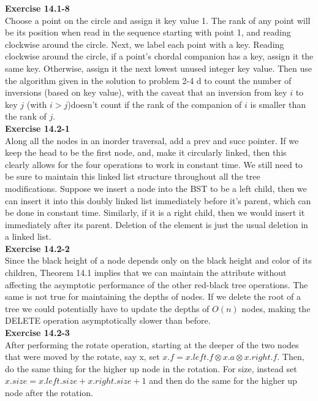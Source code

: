 \documentclass{article}
\begin{document}
\noindent\textbf{Exercise 14.1-8}\\

Choose a point on the circle and assign it key value 1. The rank of any point will be its position when read in the sequence starting with point 1, and reading clockwise around the circle.  Next, we label each point with a key.  Reading clockwise around the circle, if a point's chordal companion has a key, assign it the same key.  Otherwise, assign it the next lowest unused integer key value. Then use the algorithm given in the solution to problem 2-4 d to count the number of inversions (based on key value), with the caveat that an inversion from key $i$ to key $j$ (with $i > j$)doesn't count if the rank of the companion of $i$ is smaller than the rank of $j$.\\

\noindent\textbf{ Exercise 14.2-1} \\

Along all the nodes in an inorder traversal, add a prev and succ pointer. If we keep the head to be the first node, and, make it circularly linked, then this clearly allows for the four operations to work in constant time. We still need to be sure to maintain this linked list structure throughout all the tree modifications. Suppose we insert a node into the BST to be a left child, then we can insert it into this doubly linked list immediately before it's parent, which can be done in constant time. Similarly, if it is a right child, then we would insert it immediately after its parent. Deletion of the element is just the usual deletion in a linked list.\\

\noindent\textbf{Exercise 14.2-2}\\

Since the black height of a node depends only on the black height and color of its children, Theorem 14.1 implies that we can maintain the attribute without affecting the asymptotic performance of the other red-black tree operations.  The same is not true for maintaining the depths of nodes.  If we delete the root of a tree we could potentially have to update the depths of $O(n)$ nodes, making the DELETE operation asymptotically slower than before. \\

\noindent\textbf{ Exercise 14.2-3} \\

After performing the rotate operation, starting at the deeper of the two nodes that were moved by the rotate, say x, set $x.f  = x.left.f \otimes x.a \otimes x.right.f$. Then, do the same thing for the higher up node in the rotation. For size, instead set $x.size = x.left.size+ x.right.size + 1$ and then do the same for the higher up node after the rotation.\\
\end{document}
